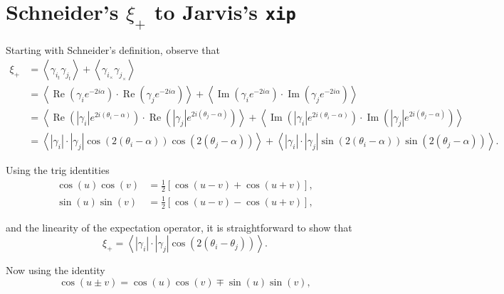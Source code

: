 \documentclass[%
 reprint,
 amsmath,amssymb,
 aps,nofootinbib
]{revtex4-1}
\begin{document}
\section*{Schneider's $\xi_+$ to Jarvis's \texttt{xip}}

Starting with Schneider's definition, observe that
\begin{align*}
\xi_+&=\left<\gamma_{i_t}\gamma_{j_t}\right>+\left<\gamma_{i_\times}\gamma_{j_\times}\right>\\
&=\left<\operatorname{Re}\left(\gamma_ie^{-2i\alpha}\right)\cdot\operatorname{Re}\left(\gamma_je^{-2i\alpha}\right)\right>+\left<\operatorname{Im}\left(\gamma_ie^{-2i\alpha}\right)\cdot\operatorname{Im}\left(\gamma_je^{-2i\alpha}\right)\right>\\
&=\left<\operatorname{Re}\left(|\gamma_i|e^{2i(\theta_i-\alpha)}\right)\cdot\operatorname{Re}\left(|\gamma_j|e^{2i(\theta_j-\alpha)}\right)\right>+\left<\operatorname{Im}\left(|\gamma_i|e^{2i(\theta_i-\alpha)}\right)\cdot\operatorname{Im}\left(|\gamma_j|e^{2i(\theta_j-\alpha)}\right)\right>\\
&=\left<|\gamma_i|\cdot|\gamma_j|\cos\left(2(\theta_i-\alpha)\right)\cos\left(2(\theta_j-\alpha)\right)\right>+\left<|\gamma_i|\cdot|\gamma_j|\sin\left(2(\theta_i-\alpha)\right)\sin\left(2(\theta_j-\alpha)\right)\right>.
\end{align*}

Using the trig identities
\begin{align}
\cos(u)\cos(v)&=\frac{1}{2}\left[\cos(u-v)+\cos(u+v)\right],\\
\sin(u)\sin(v)&=\frac{1}{2}\left[\cos(u-v)-\cos(u+v)\right],
\end{align}

and the linearity of the expectation operator, it is straightforward to show that
$$\xi_+=\left<|\gamma_i|\cdot|\gamma_j|\cos\left(2(\theta_i-\theta_j)\right)\right>.$$

Now using the identity
\begin{equation}\label{trig2}
\cos(u\pm v)=\cos\left(u\right)\cos\left(v\right)\mp\sin\left(u\right)\sin\left(v\right),
\end{equation}
\end{document}
